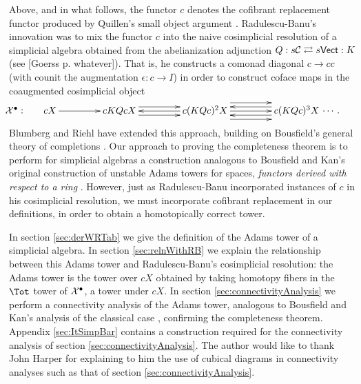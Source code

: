 \documentclass[11pt]{amsart}
\theoremstyle{plain}
\begin{document}
Above, and in what follows, the functor $c$ denotes the cofibrant replacement functor produced by Quillen's small object argument \cite{QuillenHomAlg.pdf}. Radulescu-Banu's innovation was to mix the functor $c$ into the naive cosimplicial resolution of a simplicial algebra obtained from the abelianization adjunction $Q:s\mathcal{C}\rightleftarrows s\mathsf{Vect}:K$ (see [Goerss p. whatever]). That is, he constructs a comonad diagonal $c\to cc$ (with counit the augmentation $\epsilon: c\to I$) in order to construct coface maps in the coaugmented cosimplicial object
\[\makebox[0cm][r]{\,$\calX^\bullet:\qquad $}\vcenter{
\def\labelstyle{\scriptstyle}
\xymatrix@C=1.5cm@1{
cX\,
\ar[r]
&
\,cKQcX\,
\ar[r];[]
&
\,c(KQc)^2X\,
\ar@<-1ex>[l];[]
\ar@<+1ex>[l];[]
\ar@<+1ex>[r];[]
\ar@<-1ex>[r];[]
&
\,c(KQc)^3X\,\makebox[0cm][l]{\,$\cdots. $}
\ar[l];[]
\ar@<-2ex>[l];[]
\ar@<+2ex>[l];[]
}}\]
Blumberg and Riehl \cite{BlumRiehlResolutions.pdf} have extended this approach, building on Bousfield's general theory of completions \cite{BousCosimpResnHtpySS.pdf}. Our approach to proving the completeness theorem is to perform for simplicial algebras a construction analogous to Bousfield and Kan's original construction of unstable Adams towers for spaces, \emph{functors derived with respect to a ring} \cite{BK_pairings.pdf}. However, just as Radulescu-Banu incorporated instances of $c$ in his cosimplicial resolution, we must incorporate cofibrant replacement in our definitions, in order to obtain a homotopically correct tower.

In section \ref{sec:derWRTab} we give the definition of the Adams tower of a simplicial algebra.
In section \ref{sec:relnWithRB} we explain the relationship between this Adams tower and Radulescu-Banu's cosimplicial resolution: the Adams tower is the tower over $cX$ obtained by taking homotopy fibers in the $\Tot$ tower of $\mathcal{X}^\bullet$, a tower under $cX$. %
In section \ref{sec:connectivityAnalysis} we perform a connectivity analysis of the Adams tower, analogous to Bousfield and Kan's analysis of the classical case \cite{BK_pairings.pdf}, confirming the completeness theorem. Appendix \ref{sec:ItSimpBar} contains a construction required for the connectivity analysis of section \ref{sec:connectivityAnalysis}.
The author would like to thank John Harper for explaining to him the use of cubical diagrams in connectivity analyses such as that of section \ref{sec:connectivityAnalysis}.
\end{document}
